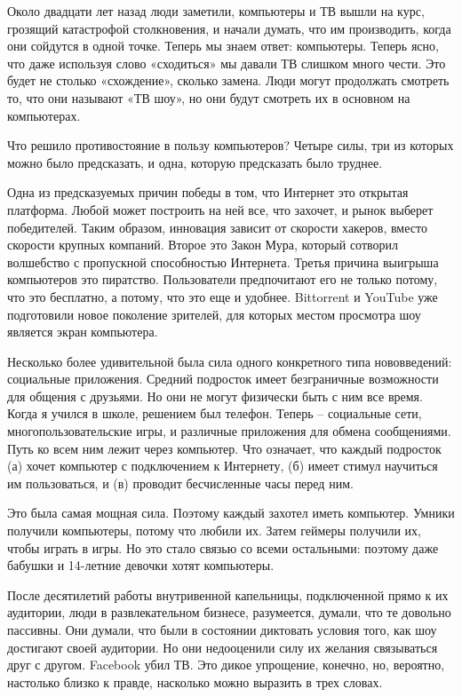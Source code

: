 \documentclass[ebook,12pt,oneside,openany]{memoir}
\date{}
\begin{document}
\maketitle

Около двадцати лет назад люди заметили, компьютеры и ТВ вышли на курс,
грозящий катастрофой столкновения, и начали думать, что им
производить, когда они сойдутся в одной точке. Теперь мы знаем ответ:
компьютеры. Теперь ясно, что даже используя слово «сходиться» мы
давали ТВ слишком много чести. Это будет не столько «схождение»,
сколько замена. Люди могут продолжать смотреть то, что они называют
«ТВ шоу», но они будут смотреть их в основном на компьютерах.

Что решило противостояние в пользу компьютеров? Четыре силы, три из
которых можно было предсказать, и одна, которую предсказать было
труднее.

Одна из предсказуемых причин победы в том, что Интернет это открытая
платформа. Любой может построить на ней все, что захочет, и рынок
выберет победителей. Таким образом, инновация зависит от скорости
хакеров, вместо скорости крупных компаний. Второе это Закон Мура,
который сотворил волшебство с пропускной способностью Интернета.
Третья причина выигрыша компьютеров это пиратство. Пользователи
предпочитают его не только потому, что это бесплатно, а потому, что
это еще и удобнее. Bittorrent и YouTube уже подготовили новое
поколение зрителей, для которых местом просмотра шоу является экран
компьютера.

Несколько более удивительной была сила одного конкретного типа
нововведений: социальные приложения. Средний подросток имеет
безграничные возможности для общения с друзьями. Но они не могут
физически быть с ним все время. Когда я учился в школе, решением был
телефон. Теперь – социальные сети, многопользовательские игры, и
различные приложения для обмена сообщениями. Путь ко всем ним лежит
через компьютер. Что означает, что каждый подросток (а) хочет
компьютер с подключением к Интернету, (б) имеет стимул научиться им
пользоваться, и (в) проводит бесчисленные часы перед ним.

Это была самая мощная сила. Поэтому каждый захотел иметь компьютер.
Умники получили компьютеры, потому что любили их. Затем геймеры
получили их, чтобы играть в игры. Но это стало связью со всеми
остальными: поэтому даже бабушки и 14-летние девочки хотят компьютеры.

После десятилетий работы внутривенной капельницы, подключенной прямо к
их аудитории, люди в развлекательном бизнесе, разумеется, думали, что
те довольно пассивны. Они думали, что были в состоянии диктовать
условия того, как шоу достигают своей аудитории. Но они недооценили
силу их желания связываться друг с другом. Facebook убил ТВ. Это дикое
упрощение, конечно, но, вероятно, настолько близко к правде, насколько
можно выразить в трех словах.
\end{document}
